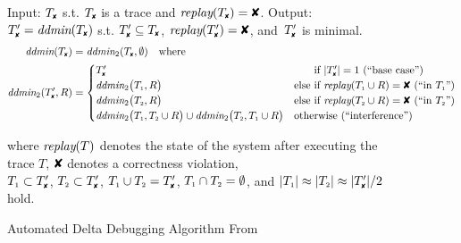\begin{figure}[t]
\caption{Automated Delta Debugging Algorithm From~\cite{Zeller:1999:YMP:318773.318946}}
\begin{boxedminipage}{\textwidth}
Input: $\cfail$ s.t. $\cfail$ is a trace and $\test(\cfail) = \FAIL$. Output: $\dfail
= \ddmin(\cfail)$ s.t. $\dfail \subseteq
\cfail$, $\test(\dfail) = \FAIL$, and~$\dfail$ is minimal.
\begin{align*}
\ddmin(\cfail) &= \ddmin_2(\cfail, \emptyset) \quad \text{where} \\
\ddmin_2(\dfail, R) &=
\begin{cases}
\dfail & \text{\hphantom{else }if $|\dfail| = 1$ (``base case'')} \\
\ddmin_2\bigl(\done, R\bigr) &
\text{else if $\test(\done \cup R) = \FAIL$ (``in $\done$'')} \\
\ddmin_2\bigl(\dtwo, R\bigr) &
\text{else if $\test(\dtwo \cup R) = \FAIL$ (``in $\dtwo$'')} \\
\ddmin_2\bigl(\done, \dtwo \cup R\bigr) \cup \ddmin_2\bigl(\dtwo, \done \cup
R\bigr) & \text{otherwise (``interference'')}
\end{cases}
\end{align*}
\begin{center}
where $\textit{replay}(T)$ denotes the state of the system after executing the trace $T$,
$\FAIL$ denotes a correctness violation, \\
$\done \subset \dfail$, $\dtwo \subset \dfail$, $\done \cup \dtwo = \dfail$, ${T_{\scriptscriptstyle 1}} \cap
{T_{\scriptscriptstyle 2}} = \emptyset$, and $|\done| \approx |\dtwo| \approx |\dfail| / 2$
hold.
\end{center}
\end{boxedminipage}
\label{fig:ddmin}
\end{figure}

